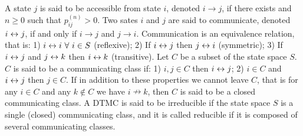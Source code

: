  A state $j$ is said to be accessible from state $i$, denoted $i \to j$, if there exists and $n \ge 0$ such that $p^{(n)}_{ij} > 0$.
 Two sates $i$ and $j$ are said to communicate, denoted $i \leftrightarrow j$, if and only if $i \to j$ and $j \to i$.
 Communication is an equivalence relation, that is: 1) $i \leftrightarrow i\ \forall\ i \in S$ (reflexive); 2) If $i \leftrightarrow j$ then $j \leftrightarrow i$ (symmetric); 3) If $i \leftrightarrow j$ and $j \leftrightarrow k$ then $i \leftrightarrow k$ (transitive).
 Let $C$ be a subset of the state space $S$. $C$ is said to be a communicating class if: 1) $i,j \in C$ then $i \leftrightarrow j$; 2) $i \in C$ and $i \leftrightarrow j$ then $j \in C$. If in addition to these properties we cannot leave $C$, that is for any $i \in C$ and any $k \notin C$ we have $i \nrightarrow k$, then $C$ is said to be a closed communicating class.
 A DTMC is said to be irreducible if the state space $S$ is a single (closed) communicating class, and it is called reducible if it is composed of several communicating classes.